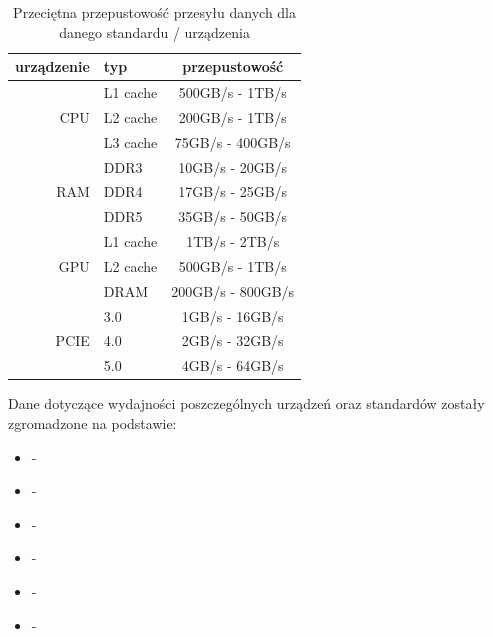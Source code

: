 \begin{table}[H]
    \begin{center}
        \caption{Przeciętna przepustowość przesyłu danych dla danego standardu / urządzenia}
        \label{tab:Przepustowość przsyłu danych}
        \begin{tabular}{r|l|c}
            urządzenie & typ & przepustowość \\
            \hline
                       & L1 cache    & 500GB/s - 1TB/s  \\
            CPU        & L2 cache    & 200GB/s - 1TB/s  \\
                       & L3 cache    & 75GB/s - 400GB/s \\
            \hline
                       & DDR3        & 10GB/s - 20GB/s  \\
            RAM        & DDR4        & 17GB/s - 25GB/s  \\
                       & DDR5        & 35GB/s - 50GB/s  \\
            \hline
                       & L1 cache    & 1TB/s - 2TB/s    \\
            GPU        & L2 cache    & 500GB/s - 1TB/s  \\
                       & DRAM        & 200GB/s - 800GB/s\\
            \hline
            \hline
                       & 3.0         & 1GB/s - 16GB/s   \\
            PCIE       & 4.0         & 2GB/s - 32GB/s   \\
                       & 5.0         & 4GB/s - 64GB/s   \\
        \end{tabular}
    \end{center}
\end{table}

Dane dotyczące wydajności poszczególnych urządzeń oraz standardów zostały zgromadzone na podstawie:
\begin{itemize}
    \item \cite{bib:performance-1} - 
    \item \cite{bib:performance-2} - 
    \item \cite{bib:performance-3} - 
    \item \cite{bib:performance-4} - 
    \item \cite{bib:performance-5} - 
    \item \cite{bib:performance-6} - 
\end{itemize}




